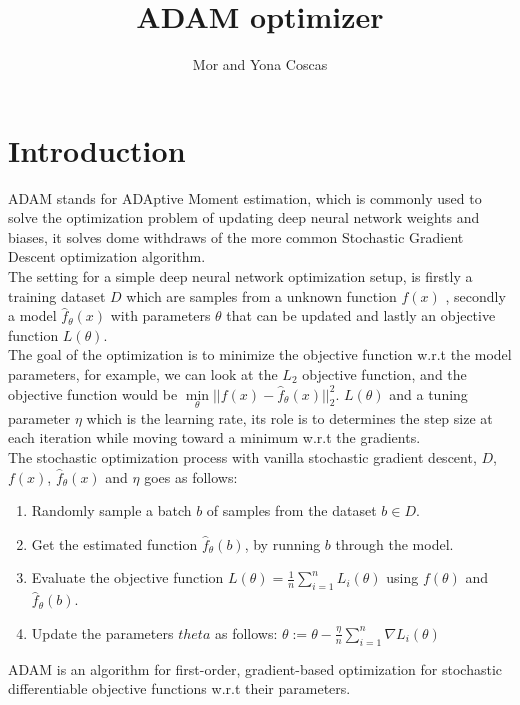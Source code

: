 \documentclass[10pt,a4paper]{article}
\title{\foreignlanguage{english}{ADAM optimizer}}
\author{Mor and Yona Coscas}
\begin{document}
\maketitle
\section{Introduction}
ADAM stands for ADAptive Moment estimation, which is commonly used to solve the optimization problem of updating deep neural network weights and biases, it solves dome withdraws of the more common Stochastic Gradient Descent optimization algorithm.\\
The setting for a simple deep neural network optimization setup, is firstly a training dataset $D$ which are samples from a unknown function $f(x)$ , secondly a model $\hat{f}_{\theta}(x)$ with parameters $\theta$ that can be updated and lastly an objective function $L(\theta)$. \\
The goal of the optimization is to minimize the objective function w.r.t the model parameters, for example, we can look at the $L_2$ objective function, and the objective function would be $\min \limits_{\theta} ||f(x) - \hat{f}_\theta (x)||^{2}_2$. $L(\theta)$ and a tuning parameter $\eta$ which is the learning rate, its role is to determines the step size at each iteration while moving toward a minimum w.r.t the gradients. \\
The stochastic optimization process with vanilla stochastic gradient descent, $D$, $f(x)$, $\hat{f}_{\theta}(x)$ and $\eta$  goes as follows:
\begin{enumerate} 
    \item Randomly sample a batch $b$ of samples from the dataset $b \in D$.
    \item Get the estimated function $\hat{f}_{\theta}(b)$, by running $b$ through the model.
    \item Evaluate the objective function $L(\theta) = \frac{1}{n} \sum_{i=1}^{n} L_i(\theta)$ using $f(\theta)$ and $\hat{f}_{\theta}(b)$.
    \item Update the parameters $theta$ as follows: $\theta:=\theta-\frac{\eta}{n}\sum_{i=1}^{n}\nabla L_i(\theta)$
\end{enumerate}
ADAM is an algorithm for first-order, gradient-based optimization for stochastic differentiable objective functions w.r.t their parameters.
\end{document}
